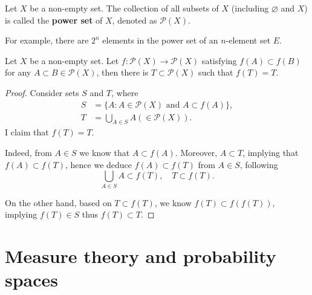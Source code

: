 \documentclass[11pt,singlecolumn, openany, citestyle=authoryear]{elegantbook}
\begin{document}
\begin{CJK}{UTF8}{gbsn}
    \begin{definition}
        Let $X$ be a non-empty set. The collection of all subsets of $X$ (including
        $\varnothing$ and $X$) is called the \textbf{power set} of $X$, denoted as 
        $\mathcal{P}(X)$.
    \end{definition}
    For example, there are $2^n$ elements in the power set of an $n$-element set $E$.
    \begin{example}
        Let $X$ be a non-empty set. Let $f:\mathcal{P}(X) \to \mathcal{P}(X)$ satisfying 
        $f(A) \subset f(B)$ for any $A\subset B \in \mathcal{P}(X)$, then there is 
        $T \subset \mathcal{P}(X)$ such that $f(T)=T$.
    \end{example}
    \begin{proof}
        Consider sets $S$ and $T$, where
        \begin{align*}
            S &= \{A:A\in\mathcal{P}(X) \text{ and } A \subset f(A)\}, \\
            T &= \bigcup_{A \in S}A (\in \mathcal{P}(X)).
        \end{align*}
        I claim that $f(T)=T$.
        
        Indeed, from $A \in S$ we know that $A \subset f(A)$. Moreover, $A \subset T$, implying 
        that $f(A) \subset f(T)$, hence we deduce $f(A)\subset f(T)$ from $A \in S$, following
        $$
        \bigcup_{A \in S}A \subset f(T), \quad T \subset f(T).
        $$
    
        On the other hand, based on $T \subset f(T)$, we know $f(T) \subset f(f(T))$, implying 
        $f(T) \in S$ thus $f(T) \subset T$. 
    \end{proof}

\chapter{Measure theory and probability spaces}

\end{CJK}
\end{document}
